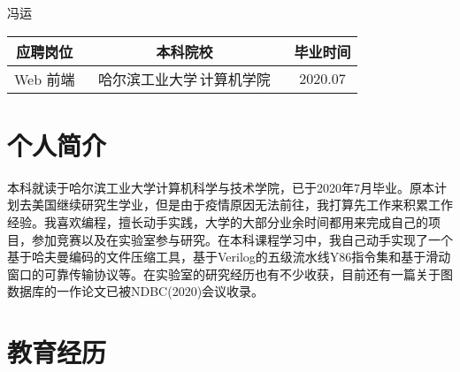\documentclass[10pt]{article} %
\begin{document}
\begin{paracol}{2} %


\parbox[top][0.12\textheight][c]{\linewidth}{ %
	\vspace{-0.04\textheight} %
	\centering %
	{\sffamily\Huge 冯运}\\
	\vspace{0.04\textheight}
	\begin{tabular}{ccc}
		\textbf{应聘岗位} & \textbf{本科院校}　& \textbf{毕业时间}\\
		\hline
		Web 前端 & 哈尔滨工业大学\,计算机学院 　& 2020.07\\
	\end{tabular}
}


\section{个人简介}

本科就读于哈尔滨工业大学计算机科学与技术学院，已于2020年7月毕业。原本计划去美国继续研究生学业，但是由于疫情原因无法前往，我打算先工作来积累工作经验。我喜欢编程，擅长动手实践，大学的大部分业余时间都用来完成自己的项目，参加竞赛以及在实验室参与研究。在本科课程学习中，我自己动手实现了一个基于哈夫曼编码的文件压缩工具，基于Verilog的五级流水线Y86指令集和基于滑动窗口的可靠传输协议等。在实验室的研究经历也有不少收获，目前还有一篇关于图数据库的一作论文已被NDBC(2020)会议收录。
\medskip %


\section{教育经历} 


\end{paracol}
\end{document}
